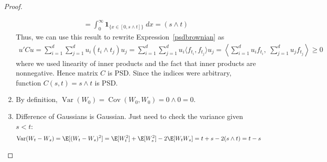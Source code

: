 \documentclass[12pt]{article}
\theoremstyle{plain}
\theoremstyle{definition}
\theoremstyle{remark}
\newcommand{\one}[1]{\mathbf{1}_{#1}}
\newcommand{\Cov}{\operatorname{Cov}}
\newcommand{\Var}{\operatorname{Var}}
\begin{document}
\begin{proof}
\begin{enumerate}[label=(\roman*)]
\begin{align*}
      = \int_0^\infty \one{\{x\in[0,s\wedge t]\}} \;dx
      = (s\wedge t)
    \end{align*}
    Thus, we can use this result to rewrite Expression~\ref{psdbrownian}
    as
    \begin{align*}
      u'Cu
      = \sum_{i=1}^d\sum_{j=1}^d
        u_i (t_i\wedge t_j) u_j
      = \sum_{i=1}^d\sum_{j=1}^d
        u_i \langle f_{t_i}, f_{t_j}\rangle u_j
      = \left\langle
        \sum_{i=1}^d u_i f_{t_i},\;
        \sum_{j=1}^d u_j f_{t_j}
        \right\rangle
      \geq 0
    \end{align*}
    where we used linearity of inner products and
    the fact that inner products are nonnegative.
    Hence matrix $C$ is PSD. Since the indices were arbitrary, function
    $C(s,t)=s\wedge t$ is PSD.

  \item By definition, $\Var(W_0)=\Cov(W_0,W_0)=0\wedge 0=0$.
  \item Difference of Gaussians is Gaussian. Just need to check the
    variance given $s<t$:
    \begin{align*}
      \Var(W_t-W_s)
      = \E[(W_t-W_s)^2]
      &= \E[W_t^2]+\E[W_s^2]-2\E[W_tW_s]
      = t+s-2(s\wedge t) = t-s
    \end{align*}


\end{enumerate}
\end{proof}
\end{document}
